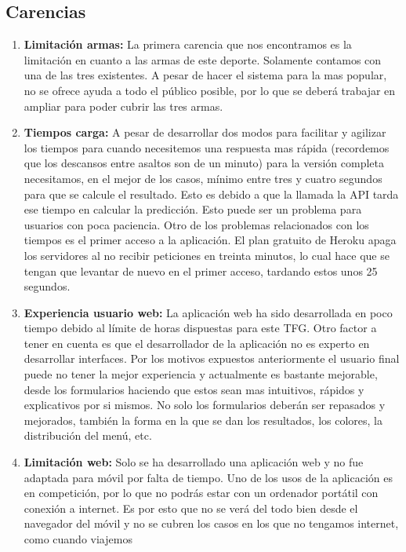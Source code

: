 \subsection{Carencias}
\begin{enumerate}
  \item \textbf{Limitación armas:} La primera carencia que nos encontramos es
    la limitación en cuanto a las armas de este deporte. Solamente contamos
    con una de las tres existentes. A pesar de hacer el sistema para la mas
    popular, no se ofrece ayuda a todo el público posible, por lo que se deberá
    trabajar en ampliar para poder cubrir las tres armas.
  \item \textbf{Tiempos carga:} A pesar de desarrollar dos modos para facilitar
    y agilizar los tiempos para cuando necesitemos una respuesta mas rápida (recordemos
    que los descansos entre asaltos son de un minuto) para la versión completa
    necesitamos, en el mejor de los casos, mínimo entre tres y cuatro segundos
    para que se calcule el resultado. Esto es debido a que la llamada la API
    tarda ese tiempo en calcular la predicción. Esto puede ser un problema para
    usuarios con poca paciencia. Otro de los problemas relacionados con los tiempos
    es el primer acceso a la aplicación. El plan gratuito de Heroku apaga los servidores
    al no recibir peticiones en treinta minutos, lo cual hace que se tengan que levantar
    de nuevo en el primer acceso, tardando estos unos 25 segundos.
  \item \textbf{Experiencia usuario web:} La aplicación web ha sido desarrollada
    en poco tiempo debido al límite de horas dispuestas para este \acs{TFG}. Otro factor
    a tener en cuenta es que el desarrollador de la aplicación no es experto
    en desarrollar interfaces. Por los motivos expuestos anteriormente el usuario
    final puede no tener la mejor experiencia y actualmente es bastante mejorable,
    desde los formularios haciendo que estos sean mas intuitivos, rápidos y explicativos
    por si mismos. No solo los formularios deberán ser repasados y mejorados, también la forma
    en la que se dan los resultados, los colores, la distribución del menú, etc.
  \item \textbf{Limitación web:} Solo se ha desarrollado una aplicación web y no fue
    adaptada para móvil por falta de tiempo. Uno de los usos de la aplicación es
    en competición, por lo que no podrás estar con un ordenador portátil con conexión
    a internet. Es por esto que no se verá del todo bien desde el navegador del móvil
    y no se cubren los casos en los que no tengamos internet, como cuando viajemos

\end{enumerate}

